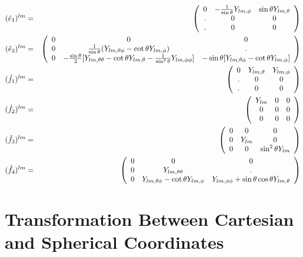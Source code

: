 \documentclass{article}
\begin{document}
\begin{eqnarray*}
(\hat{e}_1)^{lm} &=& 
\left( \begin{array}{ccc}
0  & -\frac{1}{\sin\theta}Y_{lm,\phi} & \sin\theta Y_{lm,\theta} \\
.  & 0                                & 0                        \\
.  & 0                                & 0 
\end{array}\right)
\\
(\hat{e}_2)^{lm} &=& 
\left( \begin{array}{ccc} 
0 & 0 & 0 \\
0 & \frac{1}{\sin\theta}(Y_{lm,\theta\phi}-\cot\theta Y_{lm,\phi}) & . \\
0 & -\frac{\sin\theta}{2}[Y_{lm,\theta\theta}-\cot\theta 
    Y_{lm,\theta}-\frac{1}{\sin^2\theta}Y_{lm,\phi\phi}]           & 
            -\sin\theta [Y_{lm,\theta\phi}-\cot\theta Y_{lm,\phi}]
\end{array}\right)
\\
(\hat{f}_1)^{lm} &=& 
\left( \begin{array}{ccc}
  0 & Y_{lm,\theta} & Y_{lm,\phi} \\
  . & 0   & 0           \\
  . & 0   & 0 
\end{array}\right)
\\
(\hat{f}_2)^{lm} &=& 
\left( \begin{array}{ccc}
Y_{lm} & 0 & 0 \\
0      & 0 & 0 \\
0      & 0 & 0 
\end{array}\right)
\\
(\hat{f}_3)^{lm} &=& 
\left( \begin{array}{ccc}
0 & 0  & 0                  \\
0 & Y_{lm} & 0                  \\
0 & 0  & \sin^2\theta Y_{lm} 
\end{array}\right)
\\
(\hat{f}_4)^{lm} &=& 
\left( \begin{array}{ccc}
0 & 0                   & 0 \\
0 & Y_{lm,\theta\theta} & . \\
0 & Y_{lm,\theta\phi}-\cot \theta Y_{lm,\phi} & Y_{lm,\phi\phi}+ \sin\theta \cos\theta Y_{lm,\theta}
\end{array}\right)
\end{eqnarray*}

\section{Transformation Between Cartesian and Spherical Coordinates}
\end{document}
